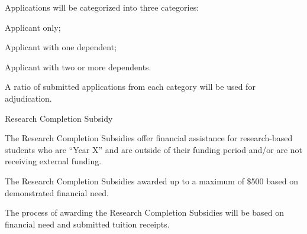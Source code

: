\begin{longenum}[ label*=\thesubsection.\arabic*., align=left]
\begin{longenum}[ label*=\arabic*., align=left]
		\item Applications will be categorized into three categories:
			\begin{longenum}[ label*=\arabic*., align=left]
			\item Applicant only;			
			\item Applicant with one dependent;
			\item Applicant with two or more dependents.
			\end{longenum}		
		\item A ratio of submitted applications from each category will be used for adjudication.					
		\end{longenum}
	\item Research Completion Subsidy
		\begin{longenum}[ label*=\arabic*., align=left]	
		\item The Research Completion Subsidies offer financial assistance for research-based students who are ``Year X'' and are outside of their funding period and/or are not receiving external funding.
		\item The Research Completion Subsidies awarded up to a maximum of \$500 based on demonstrated financial need.
		\item The process of awarding the Research Completion Subsidies will be based on financial need and submitted tuition receipts.
		\end{longenum}		
\end{longenum} 